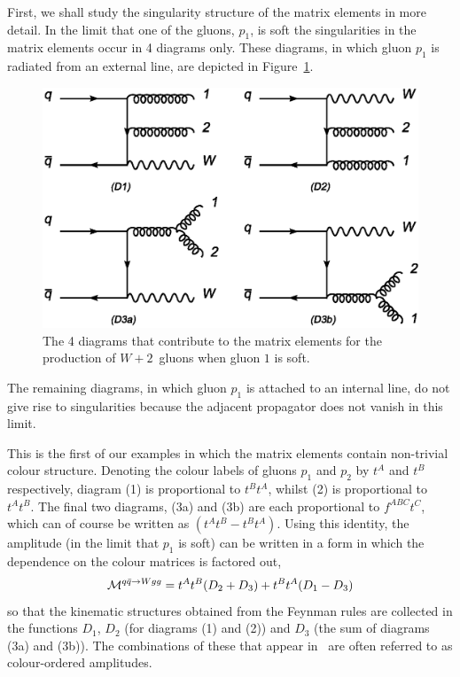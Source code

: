 \documentclass[12pt]{iopart}
\begin{document}
First, we shall study the singularity structure of the matrix elements in more detail.
In the limit that one of the gluons, $p_1$, is soft the singularities in the
matrix elements occur in 4 diagrams only. These diagrams, in which gluon $p_1$
is radiated from an external line, are depicted in Figure~\ref{fig:w2jsoft}.
%
\begin{figure}[t]
\begin{center}
\includegraphics[width=12cm]{w2jdiags.eps}
\end{center}
\caption{The 4 diagrams that contribute to the matrix elements for the production
of $W+2$~gluons when gluon $1$ is soft. \label{fig:w2jsoft}}
\end{figure}
%
The remaining diagrams, in which gluon $p_1$ is attached to an internal line,
do not give rise to singularities because the adjacent propagator does not
vanish in this limit.


This is the first of our examples in which the matrix elements contain
non-trivial colour structure. Denoting the colour labels of gluons $p_1$ and $p_2$
by $t^A$ and $t^B$ respectively, diagram (1) is proportional to $t^Bt^A$, whilst
(2) is proportional to $t^At^B$. The final two diagrams, (3a) and (3b) are each
proportional to $f^{ABC}t^C$, which can of course be written as $(t^At^B-t^Bt^A)$.
Using this identity, the amplitude (in the limit that $p_1$ is soft) can be
written in a form in which the dependence on the colour matrices is factored out,
\begin{equation}
{\cal M}^{q{\bar q} \to Wgg} = t^At^B(D_2+D_3) + t^Bt^A(D_1-D_3)
\label{eq:colstruc}
\end{equation}
so that the kinematic structures obtained from the Feynman rules are collected
in the functions $D_1$, $D_2$ (for diagrams (1) and (2)) and $D_3$ (the sum of
diagrams (3a) and (3b)). The combinations of these that appear in~
are often referred to as colour-ordered amplitudes.
\end{document}
